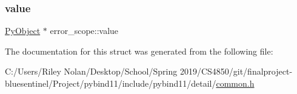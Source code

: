 \mbox{\label{structerror__scope_a191a65d0531431b7eba0886cd4702c88}} 
\subsubsection{\texorpdfstring{value}{value}}
{\footnotesize\ttfamily \mbox{\hyperlink{_python27_2object_8h_aadc84ac7aed2cfa6f20c25f62bf3dac7}{Py\+Object}} $\ast$ error\+\_\+scope\+::value}



The documentation for this struct was generated from the following file\+:\begin{DoxyCompactItemize}
\item 
C\+:/\+Users/\+Riley Nolan/\+Desktop/\+School/\+Spring 2019/\+C\+S4850/git/finalproject-\/bluesentinel/\+Project/pybind11/include/pybind11/detail/\mbox{\hyperlink{detail_2common_8h}{common.\+h}}\end{DoxyCompactItemize}
